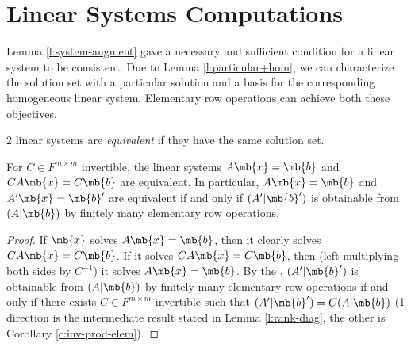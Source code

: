\section{Linear Systems Computations}
Lemma \ref{l:system-augment} gave a necessary and sufficient condition for a linear system to be consistent. Due to Lemma \ref{l:particular+hom}, we can characterize the solution set with a particular solution and a basis for the corresponding homogeneous linear system. Elementary row operations can achieve both these objectives.
\begin{defn}
2 linear systems are \emph{equivalent} if they have the same solution set.
\end{defn}
\begin{lem}
For $C \in F^{m \times m}$ invertible, the linear systems $A \mb{x}=\mb{b}$ and $CA \mb{x}=C \mb{b}$ are equivalent. In particular, $A \mb{x}=\mb{b}$ and $A' \mb{x}=\mb{b}'$ are equivalent if and only if $(A'|\mb{b}')$ is obtainable from $(A|\mb{b})$ by finitely many elementary row operations.
\end{lem}
\begin{proof}
If $\mb{x}$ solves $A \mb{x}=\mb{b}$, then it clearly solves $CA \mb{x}=C \mb{b}$. If it solves $CA \mb{x}=C \mb{b}$, then (left multiplying both sides by $C^{-1}$) it solves $A \mb{x}=\mb{b}$. By the , $(A'|\mb{b}')$ is obtainable from $(A|\mb{b})$ by finitely many elementary row operations if and only if there exists $C \in F^{m \times m}$ invertible such that $(A'|\mb{b}')=C(A|\mb{b})$ (1 direction is the intermediate result stated in Lemma \ref{l:rank-diag}, the other is Corollary \ref{c:inv-prod-elem}).
\end{proof}
